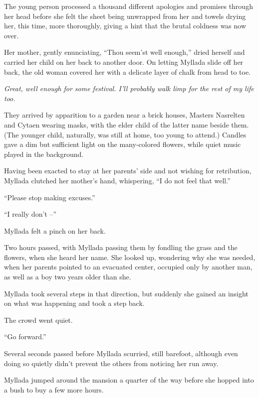 The young person processed a thousand different apologies and promises through her head before she felt the sheet being unwrapped from her and towels drying her, this time, more thoroughly, giving a hint that the brutal coldness was now over.

Her mother, gently enunciating, ``Thou seem'st well enough,'' dried herself and carried her child on her back to another door. On letting Myllada slide off her back, the old woman covered her with a delicate layer of chalk from head to toe.

\emph{Great, well enough for some festival. I'll probably walk limp for the rest of my life too.}

\centeredstars

They arrived by apparition to a garden near a brick houses, Masters Nasrelten and Cytaen wearing masks, with the elder child of the latter name beside them. (The younger child, naturally, was still at home, too young to attend.) Candles gave a dim but sufficient light on the many-colored flowers, while quiet music played in the background.

Having been exacted to stay at her parents' side and not wishing for retribution, Myllada clutched her mother's hand, whispering, ``I do not feel that well.''

``Please stop making excuses.''

``I really don't --''

Myllada felt a pinch on her back.

\centeredstars

Two hours passed, with Myllada passing them by fondling the grass and the flowers, when she heard her name. She looked up, wondering why she was needed, when her parents pointed to an evacuated center, occupied only by another man, as well as a boy two years older than she.

Myllada took several steps in that direction, but suddenly she gained an insight on what was happening and took a step back.

The crowd went quiet.

``Go forward.''

Several seconds passed before Myllada scurried, still barefoot, although even doing so quietly didn't prevent the others from noticing her run away.

Myllada jumped around the mansion a quarter of the way before she hopped into a bush to buy a few more hours.

\centeredstars

